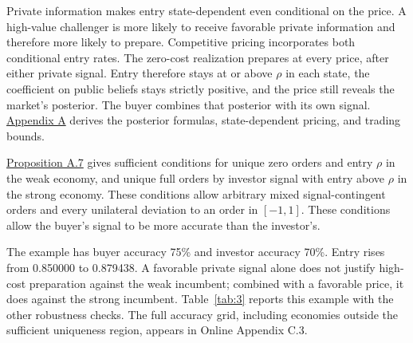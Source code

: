 Private information makes entry state-dependent even conditional on the
price. A high-value challenger is more likely to receive favorable
private information and therefore more likely to prepare. Competitive
pricing incorporates both conditional entry rates. The zero-cost
realization prepares at every price, after either private signal.
Entry therefore stays at or above \(\rho\) in each state, the
coefficient on public beliefs stays strictly positive, and the price still reveals the market's posterior. The buyer
combines that posterior with its own signal.
\hyperref[paper-appendix]{Appendix A} derives the posterior formulas,
state-dependent pricing, and trading bounds.

\hyperref[result-proposition-a-7]{Proposition A.7} gives sufficient
conditions for unique zero orders and entry \(\rho\) in the weak
economy, and unique full orders by investor signal with entry above
\(\rho\) in the strong economy. These conditions allow arbitrary mixed
signal-contingent orders and every unilateral deviation to an order in \([-1,1]\). These conditions allow the buyer's signal to be more accurate than the investor's.

The example has buyer accuracy 75\% and investor accuracy 70\%.
Entry rises from 0.850000 to 0.879438. A favorable private signal alone
does not justify high-cost preparation against the weak incumbent;
combined with a favorable price, it does against the strong incumbent.
Table~\ref{tab:3} reports this example with the other robustness checks.
The full accuracy grid, including economies outside the sufficient uniqueness region, appears in Online Appendix C.3.
